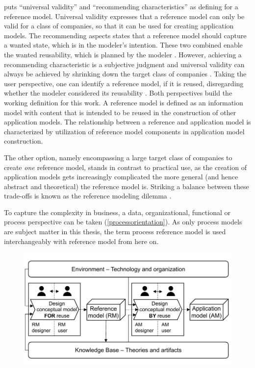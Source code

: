 			\cite{Schutte1998} puts \enquote{universal validity} and \enquote{recommending characteristics} as defining  for a reference model. Universal validity expresses that a reference model can only be valid for a class of companies, so that it can be used for creating application models. The recommending aspects states that a reference model should capture a wanted state, which is in the modeler's intention. These two combined enable the wanted reusability, which is planned by the modeler \citep[]{brocke2003referenzmodellierung}. However, achieving a recommending characteristic is a subjective judgment and universal validity can always be achieved by shrinking down the target class of companies \citep{thomas2006a}. Taking the user perspective, one can identify a reference model, if it is reused, disregarding whether the modeler considered its reusability  \citep{Puster2015}. Both perspectives build the working definition for this work. A reference model is defined as an information model with content that is intended to be reused in the construction of other application models. The relationship between a reference and application model is characterized by utilization of reference model components in application model construction. 
			
			The other option, namely encompassing a large target class of companies to create \textit{one} reference model, stands in contrast to practical use, as the creation of application models gets increasingly complicated the more general (and hence abstract and theoretical) \citep[]{Schutte1998} the reference model is. Striking a balance between these trade-offs is known as the reference modeling dilemma \citep{delfmann2006adaptive}. 
		
			To capture the complexity in business, a data, organizational, functional or process perspective can be taken (\cf \ref{processorientation}). As only process models are subject matter in this thesis, the term process reference model is used interchangeably with reference model from here on. 

				  
				  \begin{figure}[caption={Design Process of Reusable Conceptual Models}, label={fig:refmodconst}]
				  	{	\includegraphics[width=.8\textwidth]{figures/refmodconst.pdf} \\
				  		\parbox{0.8\textwidth}{}
				  	}
				  		
				  \end{figure} 
				  

